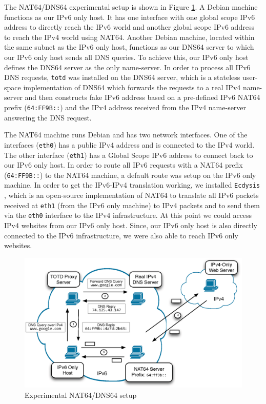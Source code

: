 \documentclass{llncs}
\begin{document}
The NAT64/DNS64 experimental setup is shown in Figure \ref{fig:NAT64Setup}. A Debian machine functions as our IPv6 only host. It has one interface with one global scope IPv6 address to directly reach the IPv6 world and another global scope IPv6 address to reach the IPv4 world using NAT64. Another Debian machine, located within the same subnet as the IPv6 only host, functions as our DNS64 server to which our IPv6 only host sends all DNS queries. To achieve this, our IPv6 only host defines the DNS64 server as the only name-server. In order to process all IPv6 DNS requests, \texttt{totd} \cite{TOTD} was installed on the DNS64 server, which is a stateless user-space implementation of DNS64 which forwards the requests to a real IPv4 name-server and then constructs fake IPv6 address based on a pre-defined IPv6 NAT64 prefix (\texttt{64:FF9B::}) and the IPv4 address received from the IPv4 name-server answering the DNS request.

The NAT64 machine runs Debian and has two network interfaces. One of the interfaces (\texttt{eth0}) has a public IPv4 address and is connected to the IPv4 world. The other interface ({\texttt{eth1}}) has a Global Scope IPv6 address to connect back to our IPv6 only host. In order to route all IPv6 requests with a NAT64 prefix (\texttt{64:FF9B::}) to the NAT64 machine, a default route was setup on the IPv6 only machine. In order to get the IPv6-IPv4 translation working, we installed \texttt{Ecdysis} \cite{ECDYSIS}, which is an open-source implementation of NAT64 to translate all IPv6 packets received at \texttt{eth1} (from the IPv6 only machine) to IPv4 packets and to send them via the \texttt{eth0} interface to the IPv4 infrastructure. At this point we could access IPv4 websites from our IPv6 only host. Since, our IPv6 only host is also directly connected to the IPv6 infrastructure, we were also able to reach IPv6 only websites.

\begin{figure}[t!]	
  \centering
  \includegraphics[scale=0.60]{nat64-setup}	
  \caption{Experimental NAT64/DNS64 setup}
  \label{fig:NAT64Setup}
\end{figure}
\end{document}
